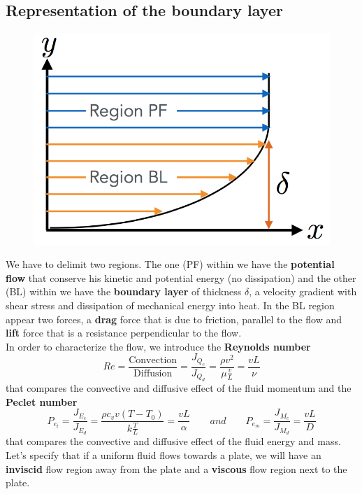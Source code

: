 \subsection{Representation of the boundary layer}
\begin{figure}
	\vspace{-5mm}
	\includegraphics[scale=0.3]{ch1/11}
\end{figure}
We have to delimit two regions. The one (PF) within we have the \textbf{potential flow} that conserve his kinetic and potential energy (no dissipation) and the other (BL) within we have the \textbf{boundary layer} of thickness $\delta$, a velocity gradient with shear stress and dissipation of mechanical energy into heat. In the BL region appear two forces, a \textbf{drag} force that is due to friction, parallel to the flow and \textbf{lift} force that is a resistance perpendicular to the flow.  \\
In order to characterize the flow, we introduce the \textbf{Reynolds number}\\
\begin{equation}
	Re = \frac{\mbox{Convection}}{\mbox{Diffusion}} = \frac{J_{Q_c}}{J_{Q_d}} = \frac{\rho v^2}{\mu \frac{v}{L}} = \frac{vL}{\nu}
\end{equation}
that compares the convective and diffusive effect of the fluid momentum and the \textbf{Peclet number}
\begin{equation}
	P_{e_t} = \frac{J_{E_c}}{J_{E_d}} = \frac{\rho c_v v (T- T_0)}{k\frac{T}{L}} = \frac{vL}{\alpha} 
	\qquad and \qquad 
	P_{e_m} = \frac{J_{M_c}}{J_{M_d}} = \frac{vL}{D} 	
\end{equation}
that compares the convective and diffusive effect of the fluid energy and mass. Let's specify that if a uniform fluid flows towards a plate, we will have an \textbf{inviscid} flow region away from the plate and a \textbf{viscous} flow region next to the plate.
	
